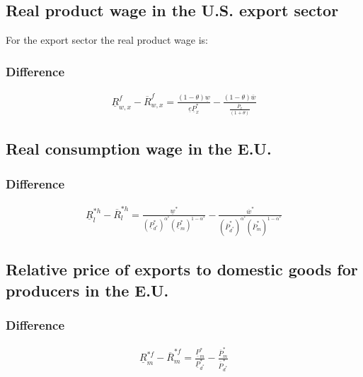\subsection*{Real product wage in the U.S. export sector}
For the export sector the real product wage is:

\subsubsection*{Difference}
\begin{equation}\label{proxw.diff} 
\begin{aligned}
\underline R^f_{w, x} - \overline R^f_{w, x} = \frac{ \left( 1-\theta \right) \underline w}{\underline e \underline P^*_x} - \frac{ \left( 1-\theta \right) \overline w}{\frac{\overline P_x}{ \left( 1+\theta \right) }}\end{aligned}  \end{equation}


\subsection*{Real consumption wage in the E.U.} 


\subsubsection*{Difference}
\begin{equation}\label{conweu.diff}
\begin{aligned}
\underline R^{*h}_l - \overline R^{*h}_l = \frac{\underline w^*}{ \left( \underline P^*_{d^*} \right) ^{\alpha^*}  \left( \underline P^*_m \right) ^{1-\alpha^*}} - \frac{\overline w^*}{ ( \overline P^*_{d^*}) ^{\alpha^*}  ( \overline P^*_m) ^{1-\alpha^*}}\end{aligned}  \end{equation}


\subsection*{Relative price of exports to domestic goods for producers in the E.U.}


\subsubsection*{Difference}
\begin{equation}\label{mproeu.diff}
\begin{aligned}
\underline R^{*f}_m - \overline R^{*f}_m = \frac{\underline P^*_m}{\underline P^*_{d^*}} - \frac{\overline P^*_m}{\overline P^*_{d^*}}\end{aligned}  \end{equation}

